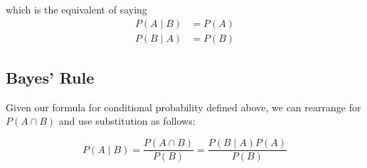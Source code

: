 which is the equivalent of saying
\begin{align*}
	P(A\; |\; B)&=P(A) \\
	P(B\; |\; A)&=P(B)
\end{align*}

\subsection{Bayes' Rule}

Given our formula for conditional probability defined above, we can rearrange for $P(A\cap B)$ and use substitution as follows:

\begin{equation*}
	P(A\; |\; B)=\frac {P(A\cap B)}{P(B)}=\frac {P(B\; |\; A)P(A)}{P(B)}
\end{equation*}
